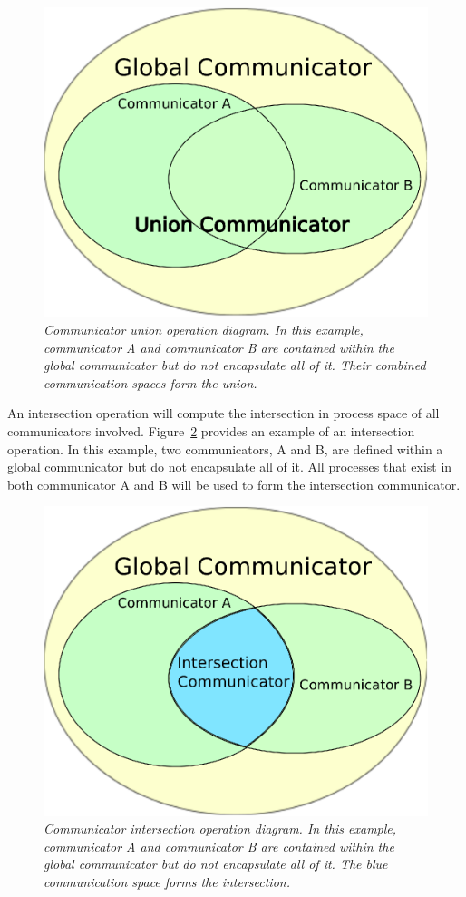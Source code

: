 \documentclass[letterpaper,12pt]{article}
\begin{document}
\begin{figure}[htpb!]
  \centering
  \includegraphics[width=5in]{union_comm.eps}
  \caption{\sl Communicator union operation diagram. In this example,
    communicator A and communicator B are contained within the global
    communicator but do not encapsulate all of it. Their combined
    communication spaces form the union.}
  \label{fig:comm_union}
\end{figure}

An intersection operation will compute the intersection in process
space of all communicators
involved. Figure~\ref{fig:comm_intersection} provides an example of an
intersection operation. In this example, two communicators, A and B,
are defined within a global communicator but do not encapsulate all of
it. All processes that exist in both communicator A and B will be used
to form the intersection communicator.

\begin{figure}[htpb!]
  \centering
  \includegraphics[width=5in]{intersection_comm.eps}
  \caption{\sl Communicator intersection operation diagram. In this
    example, communicator A and communicator B are contained within
    the global communicator but do not encapsulate all of it. The blue
    communication space forms the intersection.}
  \label{fig:comm_intersection}
\end{figure}
\end{document}
